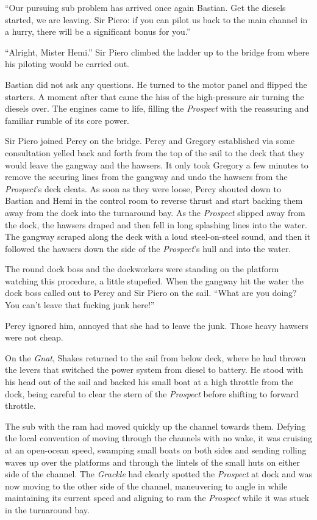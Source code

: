 \documentclass[
]{scrbook}
\begin{document}
``Our pursuing sub problem has arrived once again Bastian. Get the
diesels started, we are leaving. Sir Piero: if you can pilot us back to
the main channel in a hurry, there will be a significant bonus for
you.''

``Alright, Mister Hemi.'' Sir Piero climbed the ladder up to the bridge
from where his piloting would be carried out.

Bastian did not ask any questions. He turned to the motor panel and
flipped the starters. A moment after that came the hiss of the
high-pressure air turning the diesels over. The engines came to life,
filling the \emph{Prospect} with the reassuring and familiar rumble of
its core power.

Sir Piero joined Percy on the bridge. Percy and Gregory established via
some consultation yelled back and forth from the top of the sail to the
deck that they would leave the gangway and the hawsers. It only took
Gregory a few minutes to remove the securing lines from the gangway and
undo the hawsers from the \emph{Prospect}'s deck cleats. As soon as they
were loose, Percy shouted down to Bastian and Hemi in the control room
to reverse thrust and start backing them away from the dock into the
turnaround bay. As the \emph{Prospect} slipped away from the dock, the
hawsers draped and then fell in long splashing lines into the water. The
gangway scraped along the deck with a loud steel-on-steel sound, and
then it followed the hawsers down the side of the \emph{Prospect}'s hull
and into the water.

The round dock boss and the dockworkers were standing on the platform
watching this procedure, a little stupefied. When the gangway hit the
water the dock boss called out to Percy and Sir Piero on the sail.
``What are you doing? You can't leave that fucking junk here!''

Percy ignored him, annoyed that she had to leave the junk. Those heavy
hawsers were not cheap.

On the \emph{Gnat}, Shakes returned to the sail from below deck, where
he had thrown the levers that switched the power system from diesel to
battery. He stood with his head out of the sail and backed his small
boat at a high throttle from the dock, being careful to clear the stern
of the \emph{Prospect} before shifting to forward throttle.

The sub with the ram had moved quickly up the channel towards them.
Defying the local convention of moving through the channels with no
wake, it was cruising at an open-ocean speed, swamping small boats on
both sides and sending rolling waves up over the platforms and through
the lintels of the small huts on either side of the channel. The
\emph{Grackle} had clearly spotted the \emph{Prospect} at dock and was
now moving to the other side of the channel, maneuvering to angle in
while maintaining its current speed and aligning to ram the
\emph{Prospect} while it was stuck in the turnaround bay.
\end{document}

